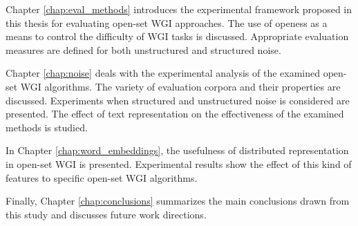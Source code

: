 Chapter \ref{chap:eval_methods} introduces the experimental framework proposed in this thesis for evaluating open-set WGI approaches. The use of openess as a means to control the difficulty of WGI tasks is discussed. Appropriate evaluation measures are defined for both unstructured and structured noise. 

Chapter \ref{chap:noise} deals with the experimental analysis of the examined open-set WGI algorithms. The variety of evaluation corpora and their properties are discussed. Experiments when structured and unstructured noise is considered are presented. The effect of text representation on the effectiveness of the examined methods is studied.

In Chapter \ref{chap:word_embeddings}, the usefulness of distributed representation in open-set WGI is presented. Experimental results show the effect of this kind of features to specific open-set WGI algorithms. 

Finally, Chapter \ref{chap:conclusions} summarizes the main conclusions drawn from this study and discusses future work directions. 

